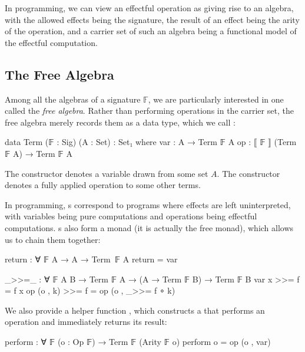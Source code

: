 In programming, we can view an effectful operation as giving rise to an algebra, with the allowed effects being the signature, the result of an effect being the arity of the operation, and a carrier set of such an algebra being a functional model of the effectful computation.

\subsection{The Free Algebra}

Among all the algebras of a signature $\mathbb{F}$, we are particularly interested in one called the \emph{free algebra}.
%
Rather than performing operations in the carrier set, the free algebra merely records them as a data type, which we call :
%
\begin{center}\begin{code}
data Term (𝔽 : Sig) (A : Set) : Set₁ where
  var : A → Term 𝔽 A
  op : ⟦ 𝔽 ⟧ (Term 𝔽 A) → Term 𝔽 A
\end{code}\end{center}
%
The  constructor denotes a variable drawn from some set $A$.
%
The  constructor denotes a fully applied operation to some other terms.
%

In programming, s correspond to programs where effects are left uninterpreted, with variables being pure computations and operations being effectful computations.
%
s also form a monad (it is actually the free monad), which allows us to chain them together:
%
\begin{center}\begin{code}
return : ∀ {𝔽} {A} → A → Term 𝔽 A
return = var

_>>=_ : ∀ {𝔽} {A B} → Term 𝔽 A → (A → Term 𝔽 B) → Term 𝔽 B
var x       >>= f =  f x
op (o , k)  >>= f =  op (o , _>>= f ∘ k)
\end{code}\end{center}
%
We also provide a helper function , which constructs a  that performs an operation and immediately returns its result:
%
\begin{center}\begin{code}
perform : ∀ {𝔽} (o : Op 𝔽) → Term 𝔽 (Arity 𝔽 o)
perform o = op (o , var)
\end{code}\end{center}


